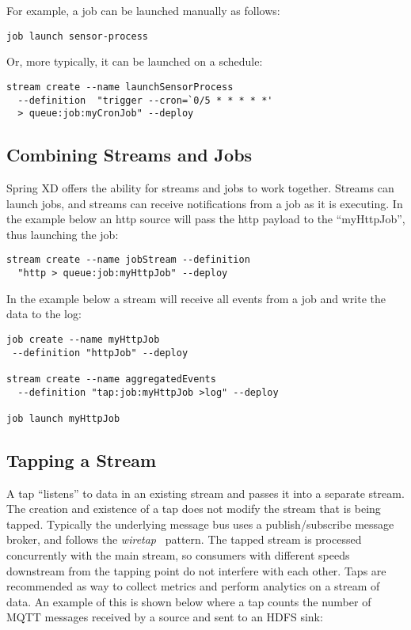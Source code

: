 For example, a job can be launched manually as follows:

\begin{lstlisting}
job launch sensor-process
\end{lstlisting}

Or, more typically, it can be launched on a schedule:

\begin{lstlisting}
stream create --name launchSensorProcess
  --definition  "trigger --cron=`0/5 * * * * *'
  > queue:job:myCronJob" --deploy
\end{lstlisting}

\subsection {Combining Streams and Jobs}

Spring XD offers the ability for streams and jobs to work together. Streams
can launch jobs, and streams can receive notifications from a job
as it is executing.  In the example below an http source will pass the http
payload to the ``myHttpJob'', thus launching the job:

\begin{lstlisting}
stream create --name jobStream --definition
  "http > queue:job:myHttpJob" --deploy
\end{lstlisting}

In the example below a stream will receive all events from a job and write
the data to the log:

\begin{lstlisting}
job create --name myHttpJob
 --definition "httpJob" --deploy

stream create --name aggregatedEvents
  --definition "tap:job:myHttpJob >log" --deploy

job launch myHttpJob
\end{lstlisting}

\subsection {Tapping a Stream} \label{sssec:deploytap}

A tap ``listens'' to data in an existing stream and passes it into a separate
stream. The creation and existence of a tap does not modify the stream that
is being tapped. Typically the underlying message bus uses a publish/subscribe
message broker, and follows the \emph{wiretap}~\cite{wiretap}
pattern. The tapped stream is processed concurrently with the main stream, so
 consumers with different speeds downstream from the tapping point do not
 interfere with each other. Taps are recommended as way to collect metrics and perform
analytics on a stream of data. An example of this is shown below where a
tap counts the number of MQTT messages received by a source and sent to an
HDFS sink:

